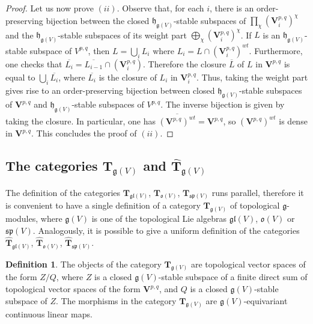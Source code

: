 \documentclass[12pt,reqno]{amsart}
\theoremstyle{definition}
\newtheorem{defn}[thm]{Definition}
\theoremstyle{remark}
\begin{document}
\begin{proof}
	Let us now prove $(ii)$. Observe that, for each $i$, there is an order-preserving bijection between the closed $\mathfrak{h}_{\mathfrak{g}(V)}$-stable subspaces of 
    $\prod_\chi (\mathbf{V}^{p,q}_{i})^\chi $ 
    and the $\mathfrak{h}_{\mathfrak{g}(V)}$-stable subspaces of its weight part $\bigoplus_\chi (\mathbf{V}^{p,q}_{i})^\chi$. If $L$ is an $\mathfrak{h}_{\mathfrak{g}(V)}$-stable subspace of ${V}^{p,q}$, then $L = \bigcup_{i} L_{i}$ where $L_{i} = L \cap (\mathbf{V}^{p,q}_{i})^{wt}$. 
	Furthermore, one checks that $\overline{L_{i}} = \overline{L_{i-1}}\cap (\mathbf{V}^{p,q}_{i})$.
	Therefore the closure $\overline{L}$ of $L$ in $\mathbf{V}^{p,q}$ is equal to $\bigcup_{i} \overline{L_{i}}$, where $\overline{L_{i}}$ is the closure of $L_{i}$ in $\mathbf{V}^{p,q}_{i}$. Thus, taking the weight part gives rise to an order-preserving bijection between closed $\mathfrak{h}_{\mathfrak{g}(V)}$-stable subspaces of $\mathbf{V}^{p,q}$ and $\mathfrak{h}_{\mathfrak{g}(V)}$-stable subspaces of $V^{p,q}$. The inverse bijection is given by taking the closure. In particular, one has $\overline{(\mathbf{V}^{p,q})^{wt}}=\mathbf{V}^{p,q}$, so $(\mathbf{V}^{p,q})^{wt}$ is dense in $\mathbf{V}^{p,q}$. This concludes the proof of $(ii)$.
	\end{proof}

	
	




	
	\subsection{The categories $\mathbf{T}_{\mathfrak{g}(V)}$ and $\widehat{\mathbf{T}}_{\mathfrak{g}(V)}$}

        The definition of the categories $\mathbf{T}_{\mathfrak{gl}(V)}$, $\mathbf{T}_{\mathfrak{o}(V)}$, $\mathbf{T}_{\mathfrak{sp}(V)}$ runs parallel, therefore it is convenient to have a single definition of a category $\mathbf{T}_{\mathfrak{g}(V)}$ of topological $\mathfrak{g}$-modules, where $\mathfrak{g}(V)$ is one of the topological Lie algebras $\mathfrak{gl}(V)$, $\mathfrak{o}(V)$ or $\mathfrak{sp}(V)$.
        Analogously, it is possible to give a uniform definition of the categories $\widehat{\mathbf{T}}_{\mathfrak{gl}(V)}$, $\widehat{\mathbf{T}}_{\mathfrak{o}(V)}$, $\widehat{\mathbf{T}}_{\mathfrak{sp}(V)}$. 
	
	\begin{defn}\label{def:tg}
		The objects of the category $\mathbf{T}_{\mathfrak{g}(V)}$ are topological vector spaces of the form $Z/Q$, where $Z$ is a closed $\mathfrak{g}(V)$-stable subspace of a finite direct sum of topological vector spaces of the form $\mathbf{V}^{p,q}$, and $Q$ is a closed $\mathfrak{g}(V)$-stable subspace of $Z$. The morphisms in the category $\mathbf{T}_{\mathfrak{g}(V)}$ are $\mathfrak{g}(V)$-equivariant continuous linear maps.
	\end{defn}
\end{document}

